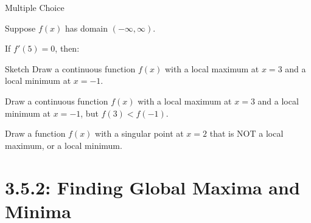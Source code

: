 \begin{frame}[t]{Multiple Choice}
\AnswerSpace
{}

Suppose $f(x)$ has domain $(-\infty,\infty)$.


If $f'(5)=0$, then:
\pause


\end{frame}
\begin{frame}[t]{Sketch}
\AnswerNo{}
Draw a continuous function $f(x)$ with a local maximum at $x=3$ and a local minimum at $x=-1$.

\vfill

Draw a  continuous function $f(x)$ with a local maximum at $x=3$ and a local minimum at $x=-1$, but $f(3)<f(-1)$.

\vfill

Draw a function $f(x)$ with a singular point at $x=2$ that is NOT a local maximum, or a local minimum.

\end{frame}

\section*{3.5.2: Finding Global Maxima and Minima}



